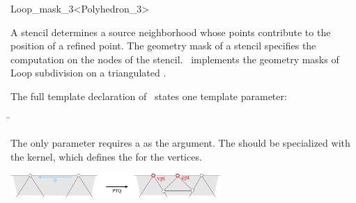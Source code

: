 \begin{ccRefClass}{Loop_mask_3<Polyhedron_3>}

\ccDefinition

A stencil determines a source neighborhood 
whose points contribute to the position of a refined point.
The geometry mask of a stencil specifies
the computation on the nodes of the stencil.
\ccClassTemplateName\ implements the geometry masks of 
Loop subdivision on a triangulated .


\ccParameters

The full template declaration of \ccClassTemplateName\ states one
template parameter:

\begin{tabbing}
 \= 
\end{tabbing}
   
The only parameter requires a  as the argument. The
 should be specialized with the 
kernel, which defines the  for the vertices.

\ccCreation
{}


\ccThreeToTwo




\begin{ccTexOnly}
  \begin{center}
    \parbox{0.6\textwidth}{%
      \includegraphics[width=0.6\textwidth]{Subdivision_method_3_ref/FIG/LoopBorderMask}%
    }\\ \vspace{0.5cm}
  \end{center}
\end{ccTexOnly}


\end{ccRefClass}
